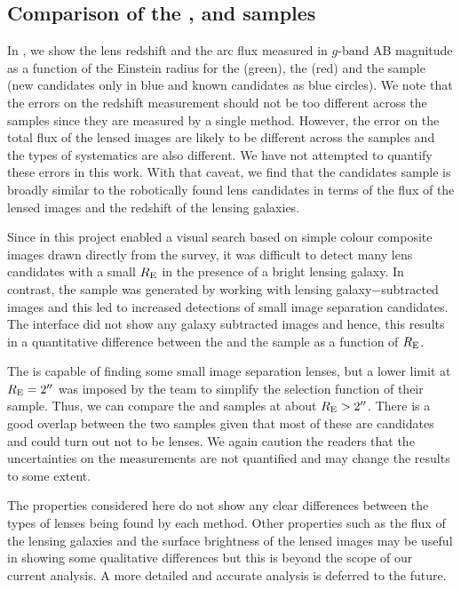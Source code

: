 \documentclass[useAMS,usenatbib,a4paper]{mn2e}
\begin{document}
\subsection{Comparison of the \rf, \sw and \af samples}

In , we show the lens redshift and the arc flux
measured in $g$-band AB magnitude as a function of the Einstein radius for the \rf
(green), the \af (red) and the \sw sample (new candidates only in blue
and known candidates as blue circles). We note that the errors on the
redshift measurement should not be too different across the samples
since they are measured by a single method. However, the error on the
total flux of the lensed images are likely to be different across the
samples and the types of systematics are also different.  We have not
attempted to quantify these errors in this work. With that caveat, we
find that the \sw candidates sample is broadly similar to the
robotically found lens candidates in terms of the flux of the lensed
images and the redshift of the lensing galaxies.

Since in this project \sw enabled a visual search based on simple colour
composite images drawn directly from the survey,
it was difficult to detect many lens
candidates with a small $R_{\rm E}$ in the presence of a bright lensing
galaxy. In contrast, the \rf sample was
generated by working with lensing galaxy$-$subtracted images and this
led to increased detections of small image separation candidates. The
\sw interface did not show any galaxy subtracted images and hence,
this results in a quantitative difference between the \sw and the \rf
sample as a function of $R_{\rm E}$.

The \af is capable of finding some small image
separation lenses, but a lower limit at $R_{\rm E}=2\hbox{$^{\prime\prime}$}$ was imposed
by the \af team to simplify the selection function of their sample.
Thus, we can compare the \sw and \af samples at about $R_{\rm
E}>2\hbox{$^{\prime\prime}$}$. There is a good overlap between the two samples given that
most of these are candidates and could turn out not to be lenses. We again
caution the readers that the uncertainties on the measurements are not
quantified and may change the results to some extent.

The properties considered here do not show any clear differences between
the types of lenses being found by each method. Other properties such as
the flux of the lensing galaxies and the surface brightness of the
lensed images may be useful in showing some qualitative differences but
this is beyond the scope of our current analysis. A more detailed and
accurate analysis is deferred to the future.
\end{document}
